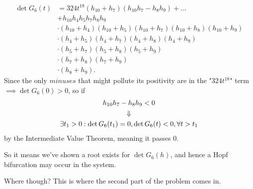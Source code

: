 \begin{equation}\label{6th_hurwitz_det}
	\begin{aligned}
		\det G_6(t)
		&=324t^{18}(h_{10}+h_7)(h_{10}h_7-h_8h_9)+\ldots\\&+h_{10}h_4h_5h_7h_8h_9\\&\cdot(h_{10}+h_4)(h_{10}+h_5)(h_{10}+h_7)(h_{10}+h_8)(h_{10}+h_9)\\&\cdot(h_4+h_5)(h_4+h_7)(h_4+h_8)(h_4+h_9)\\&\cdot(h_5+h_7)(h_5+h_8)(h_5+h_9)\\&\cdot(h_7+h_8)(h_7+h_9)\\&\cdot(h_8+h_9).
	\end{aligned}	
\end{equation}
Since the only $minuses$ that might pollute its positivity are in the "$324 t^{18}$" term $\implies \det G_6(0) > 0$, so if
\begin{gather}\label{bif_ineq_condition}
	h_{10}h_{7} - h_{8}h_{9} < 0 \\
	\Downarrow \notag \\
	\exists t_1 > 0 : \det G_6(t_1) = 0, \det G_6(t) < 0, \forall t > t_1 \notag
\end{gather}
by the Intermediate Value Theorem, meaning it passes $0$.

So it means we've shown a root exists for $\det G_6(h)$, and hence a Hopf bifurcation may occur in the system.

Where though? This is where the second part of the problem comes in.

